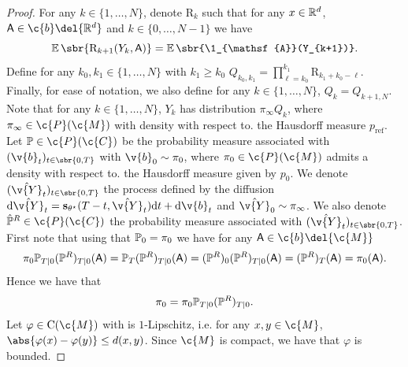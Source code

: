 \begin{proof}
	For any \(k \in \{1, \dots, N\}\), denote \(\mathrm{R}_k\) such that for any \(x \in \mathbb{R}^d\), \(\mathsf{A} \in \c{b}\del{\R^d}\) and \(k \in \{0, \dots, N-1\}\) we have \begin{equation} {\E\sbr{\mathrm{R}_{k+1}(Y_k, \mathsf{A})} = \E\sbr{\1_{\mathsf{A}}(Y_{k+1})} .
		}
	\end{equation}
	Define for any \(k_0, k_1 \in \{1, \dots, N\}\) with \(k_1 \geq k_0\) \(Q_{k_0, k_1} = \prod_{\ell = k_0}^{k_1} \mathrm{R}_{k_1 + k_0 - \ell}\).
	Finally, for ease of notation, we also define for any \(k \in \{1, \dots, N\}\), \(Q_k = Q_{k+1,N}\).
	Note that for any \(k \in \{1, \dots, N\}\), \(Y_k\) has distribution \(\pi_{\infty} Q_k\), where \(\pi_{\infty}\in \c{P}(\c{M})\) with density with respect to.
	the Hausdorff measure \(p_{\mathrm{ref}}\).
	Let \(\bb{P} \in \c{P}(\c{C})\) be the probability measure associated with \((\v{b}_t)_{t \in \sbr{0,T}}\) with \(\v{b}_0 \sim \pi_0\), where \(\pi_0 \in \c{P}(\c{M})\) admits a density with respect to.
	the Hausdorff measure given by \(p_0\).
	We denote \((\hat{\v{Y}}_t)_{t \in \sbr{0,T}}\) the process defined by the diffusion \(\mathrm{d} \hat{\v{Y}}_t = \mathbf{s}_{\theta^\star}(T-t, \hat{\v{Y}}_t) \mathrm{d} t + \mathrm{d} \v{b}_t\) and \(\hat{\v{Y}}_0 \sim \pi_\infty\).
	We also denote \(\hat{\bb{P}}^R \in \c{P}(\c{C})\) the probability measure associated with \((\hat{\v{Y}}_t)_{t \in \sbr{0,T}}\).
	First note that using that \(\bb{P}_0 = \pi_0\) we have for any \(\mathsf{A} \in \c{b}\del{\c{M}}\) \begin{equation} \pi_0 \bb{P}_{T|0} (\bb{P}^R)_{T|0} (\mathsf{A}) = \bb{P}_T (\bb{P}^R)_{T|0} (\mathsf{A}) = (\bb{P}^R)_0 (\bb{P}^R)_{T|0} (\mathsf{A}) = (\bb{P}^R)_T(\mathsf{A}) = \pi_0(\mathsf{A}) .
	\end{equation}
	Hence we have that \begin{equation} \label{eq:equality_backward} \pi_0 = \pi_0 \bb{P}_{T|0} (\bb{P}^R)_{T|0} .
	\end{equation}
	Let \(\varphi \in \mathrm{C}(\c{M})\) with is \(1\)-Lipschitz, i.e. for any \(x,y \in \c{M}\), \(\abs{\varphi(x) - \varphi(y)} \leq d(x,y)\).
	Since \(\c{M}\) is compact, we have that \(\varphi\) is bounded.

\end{proof}
